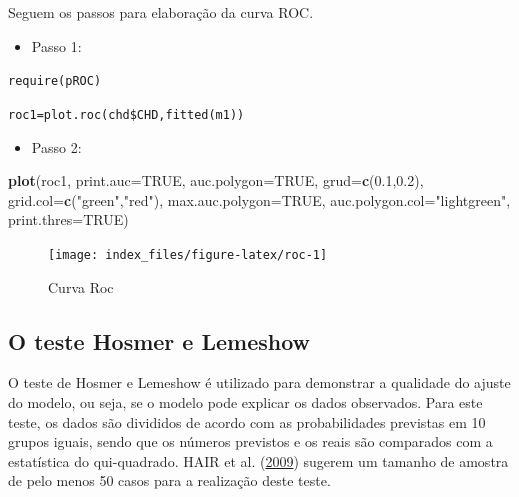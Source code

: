 \documentclass[12pt,brazil,oneside]{book}
\newenvironment{Shaded}{\begin{snugshade}}{\end{snugshade}}
\newcommand{\DataTypeTok}[1]{\textcolor[rgb]{0.13,0.29,0.53}{#1}}
\newcommand{\FloatTok}[1]{\textcolor[rgb]{0.00,0.00,0.81}{#1}}
\newcommand{\KeywordTok}[1]{\textcolor[rgb]{0.13,0.29,0.53}{\textbf{#1}}}
\newcommand{\NormalTok}[1]{#1}
\newcommand{\OtherTok}[1]{\textcolor[rgb]{0.56,0.35,0.01}{#1}}
\newcommand{\StringTok}[1]{\textcolor[rgb]{0.31,0.60,0.02}{#1}}
\providecommand{\tightlist}{%
  \setlength{\itemsep}{0pt}\setlength{\parskip}{0pt}}
\begin{document}
Seguem os passos para elaboração da curva ROC.

\begin{itemize}
\tightlist
\item
  Passo 1:
\end{itemize}

\texttt{require(pROC)}

\texttt{roc1=plot.roc(chd\$CHD,fitted(m1))}

\begin{itemize}
\tightlist
\item
  Passo 2:
\end{itemize}

\begin{Shaded}
\begin{Highlighting}[]
\KeywordTok{plot}\NormalTok{(roc1,}
     \DataTypeTok{print.auc=}\OtherTok{TRUE}\NormalTok{, }
     \DataTypeTok{auc.polygon=}\OtherTok{TRUE}\NormalTok{, }
     \DataTypeTok{grud=}\KeywordTok{c}\NormalTok{(}\FloatTok{0.1}\NormalTok{,}\FloatTok{0.2}\NormalTok{),}
     \DataTypeTok{grid.col=}\KeywordTok{c}\NormalTok{(}\StringTok{"green"}\NormalTok{,}\StringTok{"red"}\NormalTok{), }
     \DataTypeTok{max.auc.polygon=}\OtherTok{TRUE}\NormalTok{, }
     \DataTypeTok{auc.polygon.col=}\StringTok{"lightgreen"}\NormalTok{, }
     \DataTypeTok{print.thres=}\OtherTok{TRUE}\NormalTok{)}
\end{Highlighting}
\end{Shaded}

\begin{figure}[H]

{\centering \texttt{[image: index\_files/figure-latex/roc-1]} 

}

\caption{Curva Roc}\label{fig:roc}
\end{figure}

\hypertarget{o-teste-hosmer-e-lemeshow}{%
\subsection{O teste Hosmer e Lemeshow}\label{o-teste-hosmer-e-lemeshow}}

O teste de Hosmer e Lemeshow é utilizado para demonstrar a qualidade do
ajuste do modelo, ou seja, se o modelo pode explicar os dados
observados. Para este teste, os dados são divididos de acordo com as
probabilidades previstas em 10 grupos iguais, sendo que os números
previstos e os reais são comparados com a estatística do qui-quadrado.
HAIR et al. (\protect\hyperlink{ref-Hair2009}{2009}) sugerem um tamanho
de amostra de pelo menos 50 casos para a realização deste teste.
\end{document}
